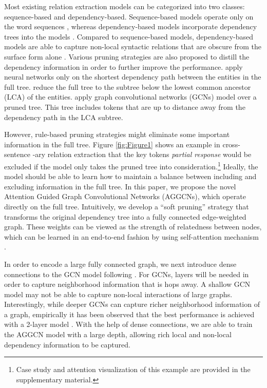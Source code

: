 \documentclass[11pt,a4paper]{article}
\begin{document}
Most existing relation extraction models can be categorized into two classes: sequence-based and dependency-based. Sequence-based models operate only on the word sequences \citep{Zeng2014RelationCV, Wang2016RelationCV}, whereas dependency-based models incorporate dependency trees into the models \citep{Bunescu2005ASP, Peng2017CrossSentenceNR}. Compared to sequence-based models, dependency-based models are able to capture non-local syntactic relations that are obscure from the surface form alone \citep{Zhang2018GraphCO}. Various pruning strategies are also proposed to distill the dependency information in order to further improve the performance. \citet{Xu2015SemanticRC, Xu2015ClassifyingRV} apply neural networks only on the shortest dependency path between the entities in the full tree. \citet{Miwa2016EndtoEndRE} reduce the full tree to the subtree below the lowest common ancestor (LCA) of the entities. \citet{Zhang2018GraphCO} apply graph convolutional networks (GCNs) \citep{Kipf2016SemiSupervisedCW} model over a pruned tree. This tree includes tokens that are up to distance  away from the dependency path in the LCA subtree. 

However, rule-based pruning strategies might eliminate some important information in the full tree. Figure \ref{fig:Figure1} shows an example in cross-sentence -ary relation extraction that the key tokens \textit{partial response} would be excluded if the model only takes the pruned tree into consideration.\footnote{Case study and attention visualization of this example are provided in the supplementary material.} Ideally, the model should be able to learn how to maintain a balance between including and excluding information in the full tree. In this paper, we propose the novel Attention Guided Graph Convolutional Networks (AGGCNs), which operate directly on the full tree. Intuitively, we develop a ``soft pruning'' strategy that transforms the original dependency tree into a fully connected edge-weighted graph. These weights can be viewed as the strength of relatedness between nodes, which can be learned in an end-to-end fashion by using self-attention mechanism \citep{Vaswani2017AttentionIA}.



In order to encode a large fully connected graph, we next introduce dense connections \citep{Huang2017DenselyCC} to the GCN model following \citep{dcgcnforgraph2seq19guo}. For GCNs,  layers will be needed in order to capture neighborhood information that is  hops away. A shallow GCN model may not be able to capture non-local interactions of large graphs. Interestingly, while deeper GCNs can capture richer neighborhood information of a graph, empirically it has been observed that the best performance is achieved with a 2-layer model \citep{Xu2018RepresentationLO}. With the help of dense connections, we are able to train the AGGCN model with a large depth, allowing rich local and non-local dependency information to be captured.
\end{document}
